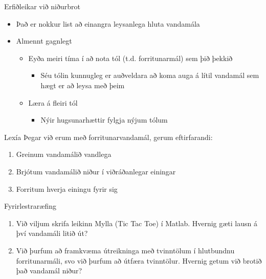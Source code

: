 \documentclass{beamer}
\begin{document}
\begin{frame}{Erfiðleikar við niðurbrot}
\begin{itemize}
 \item Það er nokkur list að einangra leysanlega hluta vandamála
 \item Almennt gagnlegt
 \begin{itemize}
  \item Eyða meiri tíma í að nota tól (t.d. forritunarmál) sem þið þekkið
  \begin{itemize}
   \item Séu tólin kunnugleg er auðveldara að koma auga á lítil vandamál sem hægt er að leysa með þeim
  \end{itemize}
  \item Læra á fleiri tól
  \begin{itemize}
   \item Nýir hugsunarhættir fylgja nýjum tólum
  \end{itemize}
 \end{itemize}
\end{itemize}
\end{frame}

\begin{frame}{Lexía}
Þegar við erum með forritunarvandamál, gerum eftirfarandi:
\begin{enumerate}
 \item Greinum vandamálið vandlega
 \item Brjótum vandamálið niður í viðráðanlegar einingar
 \item Forritum hverja einingu fyrir sig
\end{enumerate}
\end{frame}


\begin{frame}{Fyrirlestraræfing}
\begin{enumerate}
 \item Við viljum skrifa leikinn Mylla (Tic Tac Toe) í Matlab. Hvernig gæti lausn á því vandamáli litið út?
 \item Við þurfum að framkvæma útreikninga með tvinntölum í hlutbundnu forritunarmáli, svo við þurfum að útfæra tvinntölur. Hvernig getum við brotið það vandamál niður?
\end{enumerate}

\end{frame}
\end{document}
